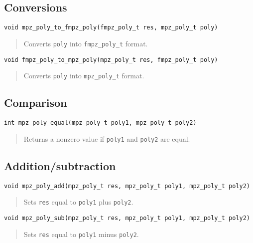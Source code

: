 \documentclass[a4paper,10pt]{article}
\newcommand{\code}{\lstinline}
\begin{document}
\subsection{Conversions}

\begin{lstlisting}
void mpz_poly_to_fmpz_poly(fmpz_poly_t res, mpz_poly_t poly)
\end{lstlisting}
\begin{quote}
Converts \code{poly} into \code{fmpz_poly_t} format.
\end{quote}

\begin{lstlisting}
void fmpz_poly_to_mpz_poly(mpz_poly_t res, fmpz_poly_t poly)
\end{lstlisting}
\begin{quote}
Converts \code{poly} into \code{mpz_poly_t} format.
\end{quote}



\subsection{Comparison}


\begin{lstlisting}
int mpz_poly_equal(mpz_poly_t poly1, mpz_poly_t poly2)
\end{lstlisting}
\begin{quote}
Returns a nonzero value if \code{poly1} and \code{poly2} are equal.
\end{quote}



\subsection{Addition/subtraction}


\begin{lstlisting}
void mpz_poly_add(mpz_poly_t res, mpz_poly_t poly1, mpz_poly_t poly2)
\end{lstlisting}
\begin{quote}
Sets \code{res} equal to \code{poly1} plus \code{poly2}.
\end{quote}

\begin{lstlisting}
void mpz_poly_sub(mpz_poly_t res, mpz_poly_t poly1, mpz_poly_t poly2)
\end{lstlisting}
\begin{quote}
Sets \code{res} equal to \code{poly1} minus \code{poly2}.
\end{quote}
\end{document}
